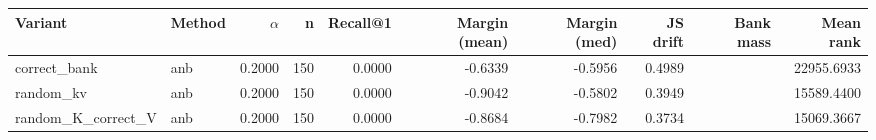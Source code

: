 \begin{tabular}{l l r r r r r r r r}
\toprule
Variant & Method & $\alpha$ & n & Recall@1 & Margin (mean) & Margin (med) & JS drift & Bank mass & Mean rank \\
\midrule
correct\_bank & anb & 0.2000 & 150 & 0.0000 & -0.6339 & -0.5956 & 0.4989 &  & 22955.6933 \\
random\_kv & anb & 0.2000 & 150 & 0.0000 & -0.9042 & -0.5802 & 0.3949 &  & 15589.4400 \\
random\_K\_correct\_V & anb & 0.2000 & 150 & 0.0000 & -0.8684 & -0.7982 & 0.3734 &  & 15069.3667 \\
\bottomrule
\end{tabular}

